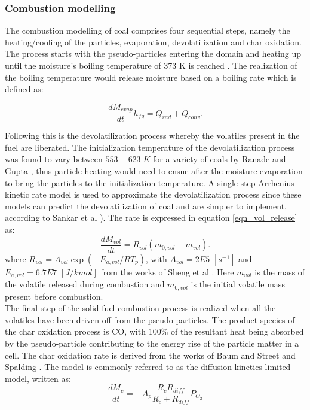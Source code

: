 \documentclass{webofc}
\begin{document}
\subsubsection{Combustion modelling}
The combustion modelling of coal comprises four sequential steps, namely the heating/cooling of the particles, evaporation, devolatilization and char oxidation. The process starts with the pseudo-particles entering the domain and heating up until the moisture's boiling temperature of 373 K is reached \cite{cengel}. The realization of the boiling temperature would release moisture based on a boiling rate which is defined as:

\begin{equation}\label{eqn_evap_release}
\frac{dM_{evap}}{dt}h_{fg}=\dot{Q}_{rad} + \dot{Q}_{conv}.
\end{equation}

Following this is the devolatilization process whereby the volatiles present in the fuel are liberated. The initialization temperature of the devolatilization process was found to vary between $553 - 623\;K$ for a variety of coals by Ranade and Gupta \cite{gupta}, thus particle heating would need to ensue after the moisture evaporation to bring the particles to the initialization temperature. A single-step Arrhenius kinetic rate model is used to approximate the devolatilization process since these models can predict the devolatilization of coal and are simpler to implement, according to Sankar et al \cite{sankar}). The rate is expressed in equation \eqref{eqn_vol_release} as:\\
\begin{equation}\label{eqn_vol_release}
\frac{dM_{vol}}{dt}=R_{vol}(m_{0,vol}-m_{vol}).
\end{equation}
where $R_{vol} = A_{vol} \exp(-E_{a,vol} / R T_p)$, with $A_{vol} = 2E5$ $[s^{-1}]$ and $E_{a,vol} = 6.7E7$ $[J/kmol]$  from the works of Sheng et al \cite{sheng}. Here $m_{vol}$ is the mass of the volatile released during combustion and $m_{0,vol}$ is the initial volatile mass present before combustion.\\

The final step of the solid fuel combustion process is realized when all the volatiles have been driven off from the pseudo-particles. The product species of the char oxidation process is CO, with 100\% of the resultant heat being absorbed by the pseudo-particle contributing to the energy rise of the particle matter in a cell. The char oxidation rate is derived from the works of Baum and Street \cite{baum} and Spalding \cite{spalding}. The model is commonly referred to as the diffusion-kinetics limited model, written as:
\begin{equation}\label{eqn_char_release}
\frac{dM_c}{dt}=-A_{p}\frac{R_{c}R_{diff}}{R_{c}+R_{diff}}P_{O_{2}}
\end{equation}
\end{document}
